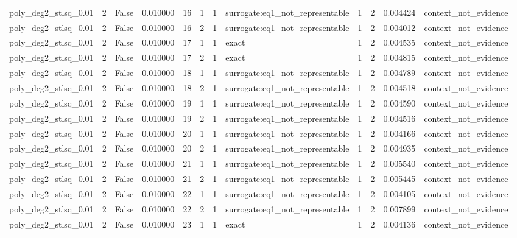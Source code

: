 \begin{tabular}{lrrrrrrlrrrl}
poly\_deg2\_stlsq\_0.01 & 2 & False & 0.010000 & 16 & 1 & 1 & surrogate:eq1\_not\_representable & 1 & 2 & 0.004424 & context\_not\_evidence \\
poly\_deg2\_stlsq\_0.01 & 2 & False & 0.010000 & 16 & 2 & 1 & surrogate:eq1\_not\_representable & 1 & 2 & 0.004012 & context\_not\_evidence \\
poly\_deg2\_stlsq\_0.01 & 2 & False & 0.010000 & 17 & 1 & 1 & exact & 1 & 2 & 0.004535 & context\_not\_evidence \\
poly\_deg2\_stlsq\_0.01 & 2 & False & 0.010000 & 17 & 2 & 1 & exact & 1 & 2 & 0.004815 & context\_not\_evidence \\
poly\_deg2\_stlsq\_0.01 & 2 & False & 0.010000 & 18 & 1 & 1 & surrogate:eq1\_not\_representable & 1 & 2 & 0.004789 & context\_not\_evidence \\
poly\_deg2\_stlsq\_0.01 & 2 & False & 0.010000 & 18 & 2 & 1 & surrogate:eq1\_not\_representable & 1 & 2 & 0.004518 & context\_not\_evidence \\
poly\_deg2\_stlsq\_0.01 & 2 & False & 0.010000 & 19 & 1 & 1 & surrogate:eq1\_not\_representable & 1 & 2 & 0.004590 & context\_not\_evidence \\
poly\_deg2\_stlsq\_0.01 & 2 & False & 0.010000 & 19 & 2 & 1 & surrogate:eq1\_not\_representable & 1 & 2 & 0.004516 & context\_not\_evidence \\
poly\_deg2\_stlsq\_0.01 & 2 & False & 0.010000 & 20 & 1 & 1 & surrogate:eq1\_not\_representable & 1 & 2 & 0.004166 & context\_not\_evidence \\
poly\_deg2\_stlsq\_0.01 & 2 & False & 0.010000 & 20 & 2 & 1 & surrogate:eq1\_not\_representable & 1 & 2 & 0.004935 & context\_not\_evidence \\
poly\_deg2\_stlsq\_0.01 & 2 & False & 0.010000 & 21 & 1 & 1 & surrogate:eq1\_not\_representable & 1 & 2 & 0.005540 & context\_not\_evidence \\
poly\_deg2\_stlsq\_0.01 & 2 & False & 0.010000 & 21 & 2 & 1 & surrogate:eq1\_not\_representable & 1 & 2 & 0.005445 & context\_not\_evidence \\
poly\_deg2\_stlsq\_0.01 & 2 & False & 0.010000 & 22 & 1 & 1 & surrogate:eq1\_not\_representable & 1 & 2 & 0.004105 & context\_not\_evidence \\
poly\_deg2\_stlsq\_0.01 & 2 & False & 0.010000 & 22 & 2 & 1 & surrogate:eq1\_not\_representable & 1 & 2 & 0.007899 & context\_not\_evidence \\
poly\_deg2\_stlsq\_0.01 & 2 & False & 0.010000 & 23 & 1 & 1 & exact & 1 & 2 & 0.004136 & context\_not\_evidence \\

\end{tabular}
